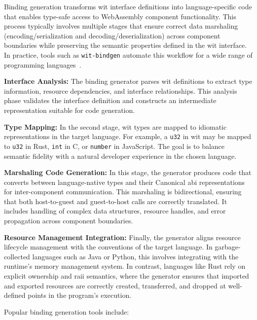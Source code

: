 Binding generation transforms \acrshort{wit} interface definitions into language-specific code that enables type-safe access to WebAssembly component functionality. This process typically involves multiple stages that ensure correct data marshaling (encoding/serialization and decoding/deserialization) across component boundaries while preserving the semantic properties defined in the \acrshort{wit} interface. In practice, tools such as \texttt{wit-bindgen} automate this workflow for a wide range of programming languages~\cite{wit_bindgen_git}.

\textbf{Interface Analysis:} The binding generator parses \acrshort{wit} definitions to extract type information, resource dependencies, and interface relationships. This analysis phase validates the interface definition and constructs an intermediate representation suitable for code generation.

\textbf{Type Mapping:} In the second stage, \acrshort{wit} types are mapped to idiomatic representations in the target language. For example, a \texttt{u32} in \acrshort{wit} may be mapped to \texttt{u32} in Rust, \texttt{int} in C, or \texttt{number} in JavaScript. The goal is to balance semantic fidelity with a natural developer experience in the chosen language.

\textbf{Marshaling Code Generation:} In this stage, the generator produces code that converts between language-native types and their Canonical \acrshort{abi} representations for inter-component communication. This marshaling is bidirectional, ensuring that both host-to-guest and guest-to-host calls are correctly translated. It includes handling of complex data structures, resource handles, and error propagation across component boundaries.

\textbf{Resource Management Integration:} Finally, the generator aligns resource lifecycle management with the conventions of the target language. In garbage-collected languages such as Java or Python, this involves integrating with the runtime’s memory management system. In contrast, languages like Rust rely on explicit ownership and \acrfull{raii} semantics, where the generator ensures that imported and exported resources are correctly created, transferred, and dropped at well-defined points in the program’s execution.

Popular binding generation tools include:

